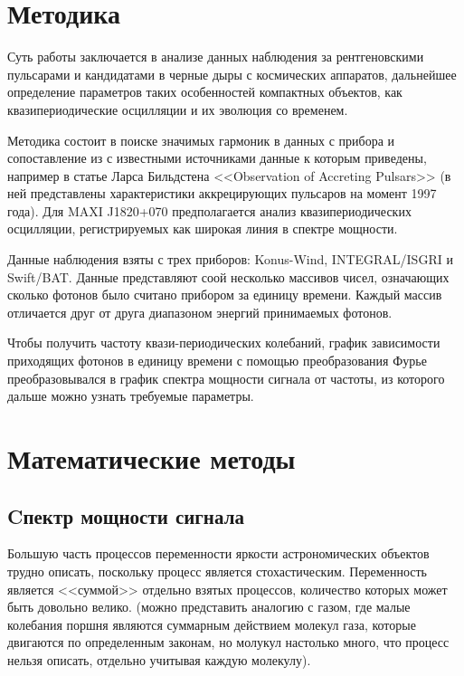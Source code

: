 \section{Методика}

	Суть работы заключается в анализе данных наблюдения за рентгеновскими пульсарами и кандидатами в черные дыры с космических аппаратов, дальнейшее определение параметров таких особенностей компактных объектов, как квазипериодические осцилляции и их эволюция со временем.

	Методика состоит в поиске значимых гармоник в данных с прибора и сопоставление из с известными источниками данные к которым приведены, например в статье Ларса Бильдстена <<Observation of Accreting Pulsars>> (в ней представлены характеристики аккрецирующих пульсаров на момент 1997 года). Для MAXI J1820+070 предполагается анализ квазипериодических осцилляции, регистрируемых как широкая линия в спектре мощности.
	
	Данные наблюдения взяты с трех приборов: Konus-Wind, INTEGRAL/ISGRI и Swift/BAT. Данные представляют соой несколько массивов чисел, означающих сколько фотонов было считано прибором за единицу времени. Каждый массив отличается друг от друга диапазоном энергий принимаемых фотонов.
	
	Чтобы получить частоту квази-периодических колебаний, график зависимости приходящих фотонов в единицу времени с помощью преобразования Фурье преобразовывался в график спектра мощности сигнала от частоты, из которого дальше можно узнать требуемые параметры.
	
\section{Математические методы}
	
	\subsection{Cпектр мощности сигнала}
		
		Большую часть процессов переменности яркости астрономических объектов трудно описать, поскольку процесс является стохастическим. Переменность является <<суммой>> отдельно взятых процессов, количество которых может быть довольно велико. (можно представить аналогию с газом, где малые колебания поршня являются суммарным действием молекул газа, которые двигаются по определенным законам, но молукул настолько много, что процесс нельзя описать, отдельно учитывая каждую молекулу).
		
